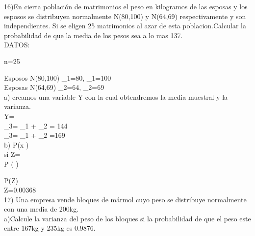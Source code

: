 \documentclass[10pt,a4paper]{article}
\begin{document}
\begin{flushleft}
\begin{justify}
\begin{multicols}{2}
	
\end{multicols}

\vspace{\baselineskip}


\newpage

\vspace{\baselineskip}\begin{justify}

	16)En cierta población de matrimonios el peso en kilogramos de las esposas y los esposos se distribuyen normalmente N(80,100) y N(64,69) respectivamente y son independientes. Si se eligen 25 matrimonios al azar de esta poblacion.Calcular la probabilidad de que la media de los pesos sea a lo mas 137.  \\
	DATOS:
	
	n=25
	
	Esposos  N(80,100)  \mu_{1}=80, \sigma_{1}=100   \\
	
	Esposas  N(64,69)   \mu_{2}=64, \sigma_{2}=69   \\
	
	a) creamos una variable Y con la cual obtendremos la media muestral y la varianza. \\
	
	Y= \\
	
	\mu_{3}= \mu_{1} + \mu_{2} = 144 \\
	
	\sigma_{3}= \sigma_{1} + \sigma_{2} =169\\
	
	b) P(x ) \\[0.2cm]
	
	si  Z= \\
	
	P ( \leqslant{})
	
	P(Z)\\
	Z=0.00368\\
	

17) Una empresa vende bloques de mármol cuyo peso se distribuye normalmente con una media de 200kg.\\
a)Calcule la varianza del peso de los bloques si la probabilidad de que el peso este entre 167kg y 235kg es 0.9876.\\[0.3cm]


\end{justify}
\end{justify}
\end{flushleft}
\end{document}
